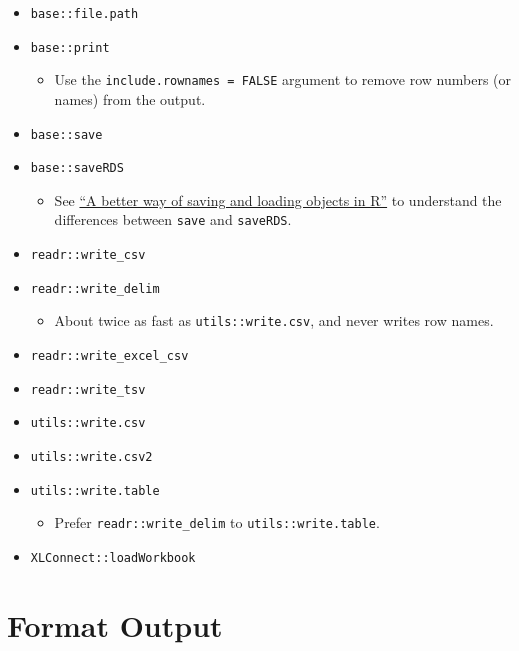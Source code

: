 \documentclass[
]{book}
\providecommand{\tightlist}{%
  \setlength{\itemsep}{0pt}\setlength{\parskip}{0pt}}
\begin{document}
\begin{itemize}
\tightlist
\item
  \texttt{base::file.path}
\item
  \texttt{base::print}

  \begin{itemize}
  \tightlist
  \item
    Use the \texttt{include.rownames\ =\ FALSE} argument to remove row numbers (or names) from the output.
  \end{itemize}
\item
  \texttt{base::save}
\item
  \texttt{base::saveRDS}

  \begin{itemize}
  \tightlist
  \item
    See \href{https://www.fromthebottomoftheheap.net/2012/04/01/saving-and-loading-r-objects/}{``A better way of saving and loading objects in R''} to understand the differences between \texttt{save} and \texttt{saveRDS}.
  \end{itemize}
\item
  \texttt{readr::write\_csv}
\item
  \texttt{readr::write\_delim}

  \begin{itemize}
  \tightlist
  \item
    About twice as fast as \texttt{utils::write.csv}, and never writes row names.
  \end{itemize}
\item
  \texttt{readr::write\_excel\_csv}
\item
  \texttt{readr::write\_tsv}
\item
  \texttt{utils::write.csv}
\item
  \texttt{utils::write.csv2}
\item
  \texttt{utils::write.table}

  \begin{itemize}
  \tightlist
  \item
    Prefer \texttt{readr::write\_delim} to \texttt{utils::write.table}.
  \end{itemize}
\item
  \texttt{XLConnect::loadWorkbook}
\end{itemize}

\hypertarget{format-output}{%
\section{Format Output}\label{format-output}}
\end{document}
